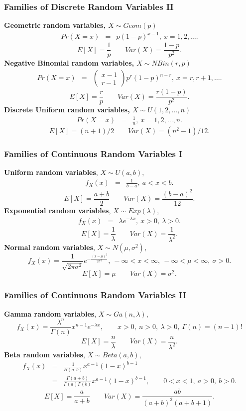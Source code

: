 \documentclass[serif,10pt,compress]{beamer}
\begin{document}
\begin{frame}[t]
\frametitle{Families of Discrete Random Variables II}

{\bf Geometric random variables, $X \sim Geom(p)$}
\begin{eqnarray*}
Pr(X=x) &=& p(1-p)^{x-1}, \ x=1,2,\ldots.
\end{eqnarray*}
\[
E[X] = \frac{1}{p} \qquad Var(X) = \frac{1-p}{p^2}.
\]
{\bf Negative Binomial random variables, $X \sim NBin(r,p)$} 
\begin{eqnarray*}
Pr(X=x) &=& \left( \begin{array}{cc} x-1 \\ r-1 \end{array} \right) p^r (1-p)^{n-r}, \ x=r,r+1,\ldots.
\end{eqnarray*}
\[
E[X] = \frac{r}{p} \qquad Var(X) = \frac{r(1-p)}{p^2}. 
\]
{\bf Discrete Uniform random variables, $X \sim U(1,2,\ldots,n)$}
\begin{eqnarray*}
Pr(X=x) &=& \frac{1}{n}, \ x=1,2,\ldots,n.
\end{eqnarray*}
\[
E[X] = (n+1)/2 \qquad Var(X) = (n^2-1)/12.
\]
\end{frame}


\begin{frame}[t]
\frametitle{Families of Continuous Random Variables I}

{\bf Uniform random variables}, $X \sim U(a,b)$,
\begin{eqnarray*}
f_X(x) &=& \frac{1}{b-a}, \ a < x < b.
\end{eqnarray*}
\[
E[X]=\frac{a+b}{2} \qquad Var(X) = \frac{(b-a)^2}{12}.
\]
{\bf Exponential random variables}, $X \sim Exp(\lambda)$, 
\begin{eqnarray*}
f_X(x)&=& \lambda e^{-\lambda x}, \ x>0, \ \lambda>0.
\end{eqnarray*}
\[
E[X]= \frac{1}{\lambda} \qquad Var(X) = \frac{1}{\lambda^2}.
\]
{\bf Normal random variables}, $X \sim N(\mu,\sigma^2)$, 
\[
f_X(x) = \frac{1}{\sqrt{2\pi \sigma^2}} e^{-\frac{(x-\mu)^2}{2\sigma^2}}, \ -\infty < x < \infty, \ -\infty < \mu < \infty, \ \sigma>0.
\]
\[
E[X]= \mu \qquad Var(X) = \sigma^2.
\]
\end{frame}

\begin{frame}[t]
\frametitle{Families of Continuous Random Variables II}
{\bf Gamma random variables}, $X \sim Ga(n,\lambda)$,
\[
f_X(x) = \frac{\lambda^{n}}{\Gamma(n)} x^{n-1}
e^{-\lambda x}, \qquad x>0, \ n>0,\ \lambda>0, \ \Gamma(n)=(n-1)!
\]
\[
E[X] = \frac{n}{\lambda} \qquad Var(X) = \frac{n}{\lambda^2}. 
\]
{\bf Beta random variables}, $X \sim Beta(a,b)$,
\begin{eqnarray*}
f_X(x) &=& \frac{1}{B(a,b)} x^{a-1}(1-x)^{b-1} \\
&=&  \frac{\Gamma(a+b)}{\Gamma(a)\Gamma(b)} x^{a-1}(1-x)^{b-1},\qquad 0<x<1, \ a>0, \ b >0. 
\end{eqnarray*}
\[
E[X]=\frac{a}{a+b} \qquad  Var(X) = \frac{ab}{(a+b)^2(a+b+1)}.
\]
\end{frame}
\end{document}
